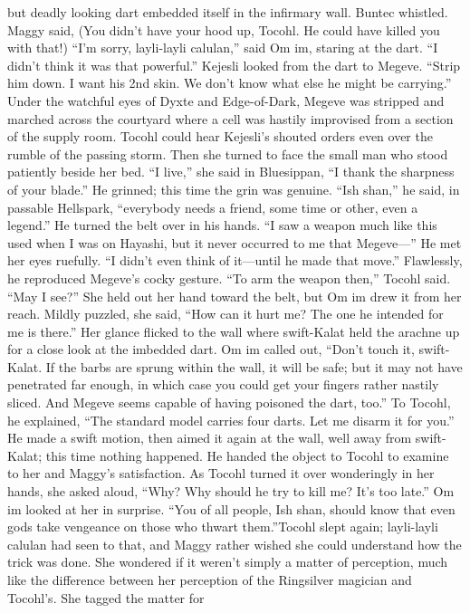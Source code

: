 \documentclass[9pt]{article}
\begin{document}
but deadly looking dart embedded itself in the infirmary wall. Buntec whistled.
Maggy said, (You didn’t have your hood up, Tocohl. He could have killed you with that!)
“I’m sorry, layli-layli calulan,” said Om im, staring at the dart. “I didn’t think it was that powerful.”
Kejesli looked from the dart to Megeve. “Strip him down. I want his 2nd skin. We don’t know what
else he might be carrying.”
Under the watchful eyes of Dyxte and Edge-of-Dark, Megeve was stripped and marched across the
courtyard where a cell was hastily improvised from a section of the supply room.
Tocohl could hear Kejesli’s shouted orders even over the rumble of the passing storm. Then she
turned to face the small man who stood patiently beside her bed. “I live,” she said in Bluesippan, “I thank
the sharpness of your blade.”
He grinned; this time the grin was genuine. “Ish shan,” he said, in passable Hellspark, “everybody
needs a friend, some time or other, even a legend.”
He turned the belt over in his hands. “I saw a weapon much like this used when I was on Hayashi,
but it never occurred to me that Megeve—” He met her eyes ruefully. “I didn’t even think of it—until he
made that move.” Flawlessly, he reproduced Megeve’s cocky gesture.
“To arm the weapon then,” Tocohl said. “May I see?” She held out her hand toward the belt, but
Om im drew it from her reach. Mildly puzzled, she said, “How can it hurt me? The one he intended for
me is there.” Her glance flicked to the wall where swift-Kalat held the arachne up for a close look at the
imbedded dart.
Om im called out, “Don’t touch it, swift-Kalat. If the barbs are sprung within the wall, it will be safe;
but it may not have penetrated far enough, in which case you could get your fingers rather nastily sliced.
And Megeve seems capable of having poisoned the dart, too.”
To Tocohl, he explained, “The standard model carries four darts. Let me disarm it for you.” He made
a swift motion, then aimed it again at the wall, well away from swift-Kalat; this time nothing happened.
He handed the object to Tocohl to examine to her and Maggy’s satisfaction.
As Tocohl turned it over wonderingly in her hands, she asked aloud, “Why? Why should he try to kill
me? It’s too late.”
Om im looked at her in surprise. “You of all people, Ish shan, should know that even gods take
vengeance on those who thwart them.”Tocohl slept again; layli-layli calulan had seen to that, and Maggy rather wished she could
understand how the trick was done. She wondered if it weren’t simply a matter of perception, much like
the difference between her perception of the Ringsilver magician and Tocohl’s. She tagged the matter for
\end{document}
